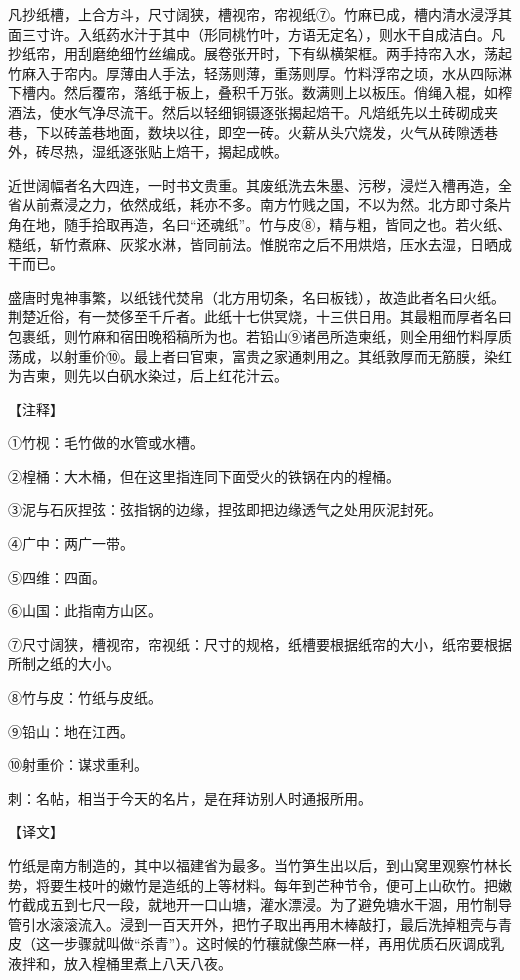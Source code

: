 \documentclass[12pt,UTF8]{ctexbook}
\begin{document}
凡抄纸槽，上合方斗，尺寸阔狭，槽视帘，帘视纸⑦。竹麻已成，槽内清水浸浮其面三寸许。入纸药水汁于其中（形同桃竹叶，方语无定名），则水干自成洁白。凡抄纸帘，用刮磨绝细竹丝编成。展卷张开时，下有纵横架框。两手持帘入水，荡起竹麻入于帘内。厚薄由人手法，轻荡则薄，重荡则厚。竹料浮帘之顷，水从四际淋下槽内。然后覆帘，落纸于板上，叠积千万张。数满则上以板压。俏绳入棍，如榨酒法，使水气净尽流干。然后以轻细铜镊逐张揭起焙干。凡焙纸先以土砖砌成夹巷，下以砖盖巷地面，数块以往，即空一砖。火薪从头穴烧发，火气从砖隙透巷外，砖尽热，湿纸逐张贴上焙干，揭起成帙。

近世阔幅者名大四连，一时书文贵重。其废纸洗去朱墨、污秽，浸烂入槽再造，全省从前煮浸之力，依然成纸，耗亦不多。南方竹贱之国，不以为然。北方即寸条片角在地，随手拾取再造，名曰“还魂纸”。竹与皮⑧，精与粗，皆同之也。若火纸、糙纸，斩竹煮麻、灰浆水淋，皆同前法。惟脱帘之后不用烘焙，压水去湿，日晒成干而已。

盛唐时鬼神事繁，以纸钱代焚帛（北方用切条，名曰板钱），故造此者名曰火纸。荆楚近俗，有一焚侈至千斤者。此纸十七供冥烧，十三供日用。其最粗而厚者名曰包裹纸，则竹麻和宿田晚稻稿所为也。若铅山⑨诸邑所造柬纸，则全用细竹料厚质荡成，以射重价⑩。最上者曰官柬，富贵之家通刺用之。其纸敦厚而无筋膜，染红为吉柬，则先以白矾水染过，后上红花汁云。

【注释】

①竹枧：毛竹做的水管或水槽。

②楻桶：大木桶，但在这里指连同下面受火的铁锅在内的楻桶。

③泥与石灰捏弦：弦指锅的边缘，捏弦即把边缘透气之处用灰泥封死。

④广中：两广一带。

⑤四维：四面。

⑥山国：此指南方山区。

⑦尺寸阔狭，槽视帘，帘视纸：尺寸的规格，纸槽要根据纸帘的大小，纸帘要根据所制之纸的大小。

⑧竹与皮：竹纸与皮纸。

⑨铅山：地在江西。

⑩射重价：谋求重利。

刺：名帖，相当于今天的名片，是在拜访别人时通报所用。

【译文】

竹纸是南方制造的，其中以福建省为最多。当竹笋生出以后，到山窝里观察竹林长势，将要生枝叶的嫩竹是造纸的上等材料。每年到芒种节令，便可上山砍竹。把嫩竹截成五到七尺一段，就地开一口山塘，灌水漂浸。为了避免塘水干涸，用竹制导管引水滚滚流入。浸到一百天开外，把竹子取出再用木棒敲打，最后洗掉粗壳与青皮（这一步骤就叫做“杀青”）。这时候的竹穰就像苎麻一样，再用优质石灰调成乳液拌和，放入楻桶里煮上八天八夜。
\end{document}
